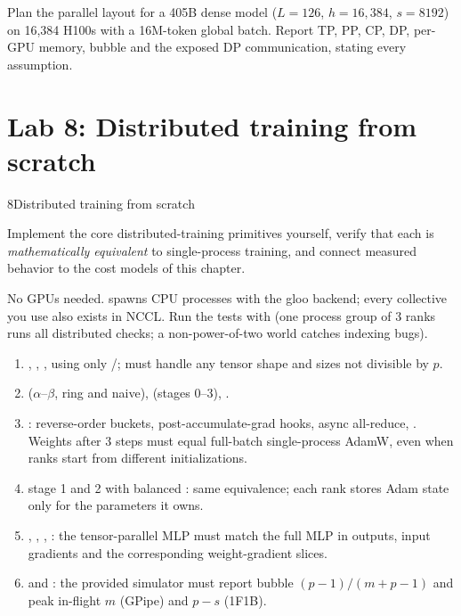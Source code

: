 \begin{exercise}
Plan the parallel layout for a 405B dense model ($L=126$, $h=16{,}384$, $s=8192$) on 16{,}384
H100s with a 16M-token global batch. Report TP, PP, CP, DP, per-GPU memory, bubble and the
exposed DP communication, stating every assumption.
\end{exercise}

\section{Lab 8: Distributed training from scratch}\label{sec:dist:lab}

\begin{labbox}{8}{Distributed training from scratch}

Implement the core distributed-training primitives yourself, verify that each is
\emph{mathematically equivalent} to single-process training, and connect measured behavior to
the cost models of this chapter.

No GPUs needed.  spawns CPU processes
with the gloo backend; every collective you use also exists in NCCL. Run the tests with
 (one process group of 3
ranks runs all distributed checks; a non-power-of-two world catches indexing bugs).

\begin{enumerate}
\item {}, , ,
   using only /; must handle any tensor shape and
  sizes not divisible by $p$.
\item {} ($\alpha$--$\beta$, ring and naive), 
  (stages 0--3), .
\item {}: reverse-order buckets, post-accumulate-grad hooks, async all-reduce,
  . Weights after 3 steps must equal full-batch
  single-process AdamW, even when ranks start from different initializations.
\item {} stage 1 and 2 with balanced : same equivalence;
  each rank stores Adam state only for the parameters it owns.
\item {}, , ,
  : the tensor-parallel MLP must match the full MLP in outputs, input
  gradients and the corresponding weight-gradient slices.
\item {} and : the provided simulator must report bubble
  $(p-1)/(m+p-1)$ and peak in-flight $m$ (GPipe) and $p-s$ (1F1B).
\end{enumerate}


\end{labbox}
